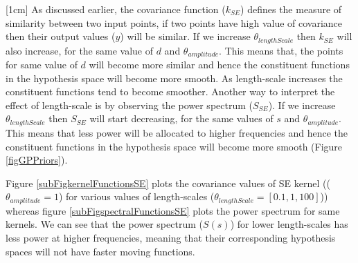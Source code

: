 [1cm]
As discussed earlier, the covariance function ($k_{SE}$) defines the measure of similarity between two input points, if two points have high value of covariance then their output values ($y$) will be similar. If we increase $\theta_{lengthScale}$ then $k_{SE}$ will also increase, for the same value of $d$ and $\theta_{amplitude}$. This means that, the points for same value of $d$ will become more similar and hence the constituent functions in the hypothesis space will become more smooth. As length-scale increases the constituent functions tend to become smoother. Another way to interpret the effect of length-scale is by observing the power spectrum ($S_{SE}$). If we increase $\theta_{lengthScale}$ then $S_{SE}$ will start decreasing, for the same values of $s$ and $\theta_{amplitude}$. This means that less power will be allocated to higher frequencies and hence the constituent functions in the hypothesis space will become more smooth (Figure \ref{figGPPriors}). 

Figure \ref{subFigkernelFunctionsSE} plots the covariance values of SE kernel (($\theta_{amplitude} = 1$) for various values of length-scales ($\theta_{lengthScale} = [0.1, 1, 100]$)) whereas figure \ref{subFigspectralFunctionsSE} plots the power spectrum for same kernels. We can see that the power spectrum ($S(s)$) for lower length-scales has less power at higher frequencies, meaning that their corresponding hypothesis spaces will not have faster moving functions. 

